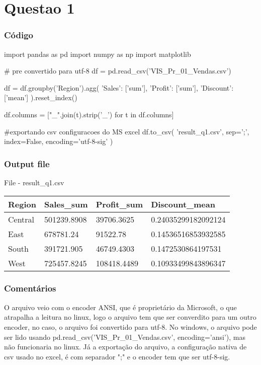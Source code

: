 \chapter{Questao 1}

\subsection*{Código}

\begin{python}
import pandas as pd
import numpy as np
import matplotlib

# pre convertido para utf-8
df = pd.read_csv('VIS_Pr_01_Vendas.csv')

df = df.groupby('Region').agg(
    {
        'Sales': ['sum'],
        'Profit': ['sum'],
        'Discount': ['mean']     
    }
).reset_index()


df.columns = ["_".join(t).strip('_') for t in df.columns]

#exportando csv configuracoes do MS excel
df.to_csv(
    'result_q1.csv',
    sep=';',
    index=False,
    encoding='utf-8-sig'
)
\end{python}

\subsection*{Output file}


\begin{quadro}[htb]
	\caption{File - result\_q1.csv }
    \begin{tabular}{|l|l|l|l|}
		\hline
        Region & Sales\_sum & Profit\_sum & Discount\_mean \\ \hline
        Central&501239.8908&39706.3625&0.24035299182092124 \\ \hline
        East&678781.24&91522.78&0.14536516853932585 \\ \hline
        South&391721.905&46749.4303&0.1472530864197531 \\ \hline
        West&725457.8245&108418.4489&0.10933499843896347 \\ \hline
	\end{tabular}
	\end{quadro}

\subsection*{Comentários}
 O arquivo veio com o encoder ANSI, que é proprietário da Microsoft, o que atrapalha a leitura no linux, logo o arquivo tem que ser converdito para um outro encoder,
 no caso, o arquivo foi convertido para utf-8.
 No windows, o arquivo pode ser lido usando pd.read\_csv('VIS\_Pr\_01\_Vendas.csv', encoding='ansi'), mas não funcionaria no linux.
 Já a exportação do arquivo, a configuração nativa de csv usado no excel, é com separador ";" e o encoder tem que ser utf-8-sig.